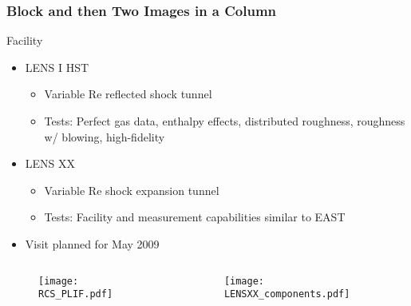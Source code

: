 \documentclass[mathserif]{beamer}
\begin{document}
\begin{frame}                                                                                                                                                                          
\frametitle{Block and then Two Images in a Column}
\vspace {-1 mm}
\begin{block}{Facility}
\begin{itemize}
\item LENS I HST
  \begin{itemize}
  \item Variable Re reflected shock tunnel
  \item Tests: Perfect gas data, enthalpy effects, distributed roughness, roughness w/ blowing,  high-fidelity
  \end{itemize}
\item LENS XX
  \begin{itemize}
  \item Variable Re shock expansion tunnel
  \item Tests: Facility and measurement capabilities similar to EAST
  \end{itemize}
\item Visit planned for May 2009
\end{itemize}
\end{block}

\begin{columns}
  \begin{column}[l]{0.45\linewidth}
  \begin{figure}[h]
  \begin{center}
  \vspace {-5 mm}
  \texttt{[image: RCS\_PLIF.pdf]} %
  \end{center}
  \end{figure}
  \end{column}

  \begin{column}[r]{0.45\linewidth}
  \begin{figure}[h]
  \begin{center}
  \vspace {-5 mm}
  \texttt{[image: LENSXX\_components.pdf]} %
  \end{center}
  \end{figure}
  \end{column}
\end{columns}
\end{frame}
\end{document}
